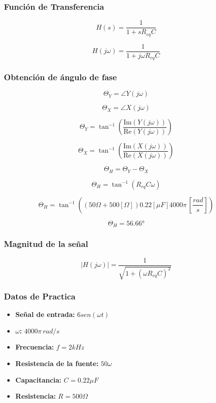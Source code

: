 \documentclass[12pt, letterpaper]{article}
\begin{document}
\subsubsection*{Función de Transferencia}

\[H(s) = \frac{1}{1+sR_{eq}C}\]

\[H(j\omega) = \frac{1}{1+j\omega R_{eq}C}\]

\subsubsection*{Obtención de ángulo de fase}

\[\Theta_Y = \angle Y(j\omega)\]

\[\Theta_X = \angle X(j\omega)\]

\[\Theta_Y = \tan^{-1}\left(\frac{\text{Im}(Y(j\omega))}{\text{Re}(Y(j\omega))}\right)\]

\[\Theta_X = \tan^{-1}\left(\frac{\text{Im}(X(j\omega))}{\text{Re}(X(j\omega))}\right)\]

\[\Theta_H = \Theta_Y - \Theta_X\]

\[\Theta_H = \tan^{-1}\left(R_{eq}C\omega\right)\]

\[\Theta_H = \tan^{-1}\left((50\Omega +500[\Omega] )0.22[\mu F] 4000 \pi \, \left[\frac{rad}{s} \right] \right)\]

\[\Theta_H = 56.66°\]

\subsubsection*{Magnitud de la señal}

\[
|H(j\omega)| = \frac{1}{\sqrt{1 + (\omega R_{eq} C)^2}}
\]

\subsubsection*{Datos de Practica}

\begin{itemize}
	\item \textbf{Señal de entrada:} \(6 sen (\omega t)\)
	\item \textbf{\(\omega\):} \(4000 \pi \, rad/s\)
	\item \textbf{Frecuencia:} \(f = 2 kHz\)
	\item \textbf{Resistencia de la fuente:} \(50 \omega\)
	\item \textbf{Capacitancia:} \(C =  0.22 \mu F\)
	\item \textbf{Resistencia:} \(R = 500 \Omega\)
\end{itemize}
\end{document}
